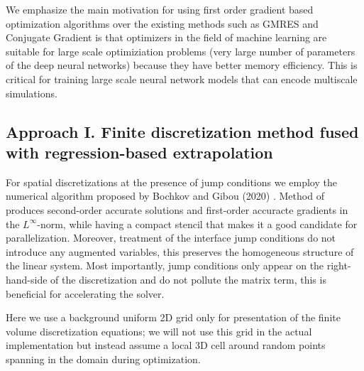 \documentclass{elsarticle}
\begin{document}
We emphasize the main motivation for using first order gradient based optimization algorithms over the existing methods such as GMRES and Conjugate Gradient is that optimizers in the field of machine learning are suitable for large scale optimiziation problems (very large number of parameters of the deep neural networks) because they have better memory efficiency. This is critical for training large scale neural network models that can encode multiscale simulations.









\subsection{Approach I. Finite discretization method fused with regression-based extrapolation}\label{sec::FD}

For spatial discretizations at the presence of jump conditions we employ the numerical algorithm proposed by Bochkov and Gibou (2020) \cite{bochkov2020solving}. Method of \cite{bochkov2020solving} produces second-order accurate solutions and first-order accuracte gradients in the $L^\infty$-norm, while having a compact stencil that makes it a good candidate for parallelization. Moreover, treatment of the interface jump conditions do not introduce any augmented variables, this preserves the homogeneous structure of the linear system. Most importantly, jump conditions only appear on the right-hand-side of the discretization and do not pollute the matrix term, this is beneficial for accelerating the solver.

Here we use a background uniform 2D grid only for presentation of the finite volume discretization equations; we will not use this grid in the actual implementation but instead assume a local 3D cell around random points spanning in the domain during optimization. 
\end{document}
